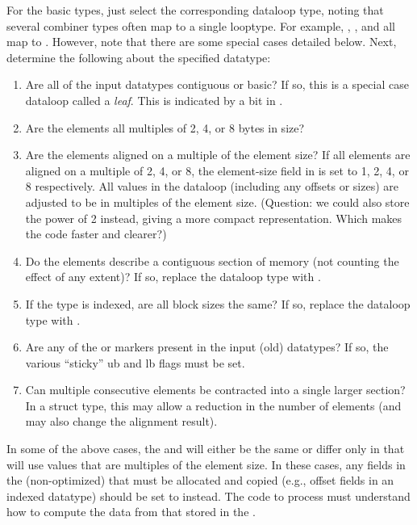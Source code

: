 \documentclass{article}
\begin{document}
\begin{enumerate}
  For the basic types, just select the corresponding dataloop type,
  noting that several combiner types often map to a single looptype.  For
  example, , ,
  and  all map to
  .  However, note that there are some special cases
  detailed below.  
  Next, determine the following about the specified datatype:
  \begin{enumerate}
    \item Are all of the input datatypes contiguous or basic?  If so, this is
          a special case dataloop called a \emph{leaf}.  This is indicated 
          by a bit in .
    \item Are the elements all multiples of 2, 4, or 8 bytes in size?
    \item Are the elements aligned on a multiple of the element size?
      If all elements are aligned on a multiple of 2, 4, or 8, the 
      element-size field in  is set to 1, 2, 4, or 8
      respectively.  All values in the dataloop (including any offsets or
      sizes) are adjusted to be in multiples of the element size.
      (Question: we could also store the power of 2 instead, giving a more 
      compact representation.  Which makes the code faster and clearer?)
    \item Do the elements describe a contiguous section of memory (not
      counting the effect of any extent)?
      If so, replace the dataloop type with .
    \item If the type is indexed, are all block sizes the same?
      If so, replace the dataloop type with .
    \item Are any of the  or  markers
      present in the input (old) datatypes?
    If so, the various ``sticky'' ub and lb flags must be set.
    \item Can multiple consecutive elements be contracted into a single 
      larger section?  In a struct type, this may allow a reduction in
      the number of elements (and may also change the alignment result).
  \end{enumerate}
  In some of the above cases, the  and  will
  either be the same or differ only in that  will use 
  values that are multiples of the element size.  In these cases, any 
  fields in the (non-optimized)  that must be allocated and 
  copied (e.g., offset fields in an indexed datatype) should be set to
   instead.  The code to process  must
  understand how to compute the data from that stored in the
  .  


\end{enumerate}
\end{document}

